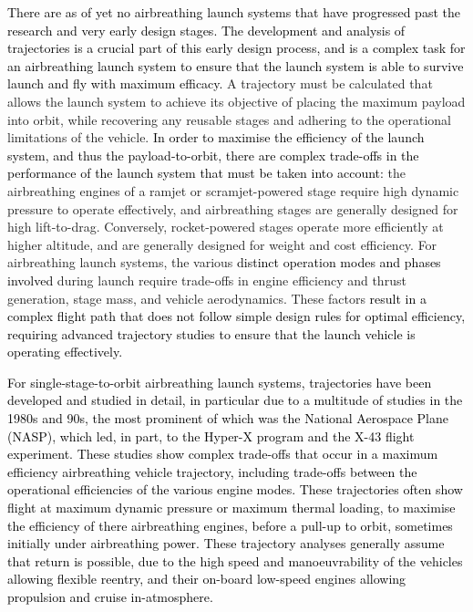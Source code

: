   	\textcolor{black}{There are as of yet no airbreathing launch systems that have progressed past the research and very early design stages\cite{Argus,Powell1991,Trefny1999,Roche2000,Pescetelli2012,Young2006,Bradford2000,Hyperion,Wilhite1991,Fujikawa2017,Mehta2001,Takahashi1997,Aberleen,Germain2001,Eklund2012,Bradford2002,Kimura1999,Preller2018a}. The development and analysis of trajectories is a crucial part of this early design process, and is a complex task for an airbreathing launch system to ensure that the launch system is able to survive launch and fly with maximum efficacy.}
  	 A trajectory must be calculated that allows the launch system to achieve its objective of placing the maximum payload into orbit, while recovering any reusable stages and adhering to the operational limitations of the vehicle\cite{Bulirsch1995}.  
  	\textcolor{black}{ In order to maximise the efficiency of the launch system, and thus the payload-to-orbit, there are complex trade-offs in the performance of the launch system that must be taken into account:} the airbreathing engines of a ramjet or scramjet-powered stage require high dynamic pressure to operate effectively, and airbreathing stages are generally designed for high lift-to-drag. Conversely, rocket-powered stages operate more efficiently at higher altitude, and are generally designed for weight and cost efficiency. For airbreathing launch systems, the various \textcolor{black}{distinct operation modes and phases involved} during launch require trade-offs in engine efficiency and thrust generation, stage mass, and vehicle aerodynamics. These factors \textcolor{black}{result in a complex flight path that does not follow simple design rules for optimal efficiency, requiring advanced trajectory studies to ensure that the launch vehicle is operating effectively.}
  	 
  
  	 \textcolor{black}{
  	   For single-stage-to-orbit airbreathing launch systems, trajectories have been developed and studied in detail\cite{Argus,Powell1991,Trefny1999,Roche2000,Pescetelli2012,Young2006,Bradford2000,Hyperion}, in particular due to a multitude of studies in the 1980s and 90s, the most prominent of which was the National Aerospace Plane (NASP), which led, in part, to the Hyper-X program and the X-43 flight experiment\cite{Mcclinton2008}. These studies show complex trade-offs that occur in a maximum efficiency airbreathing vehicle trajectory, including trade-offs between the operational efficiencies of the various engine modes. These trajectories often show flight at maximum dynamic pressure or maximum thermal loading, to maximise the efficiency of there airbreathing engines, before a pull-up to orbit, sometimes initially under airbreathing power. These trajectory analyses generally assume that return is possible, due to the high speed and manoeuvrability of the vehicles allowing flexible reentry, and their on-board low-speed engines allowing propulsion and cruise in-atmosphere. 
  	}
  	
